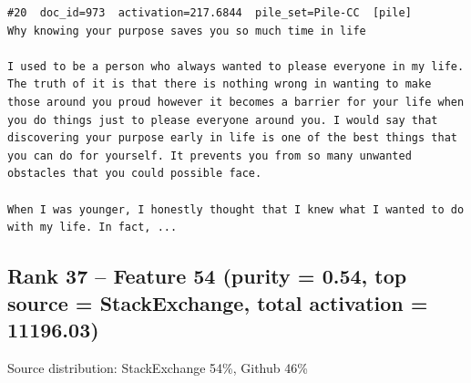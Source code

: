 \begin{verbatim}
#20  doc_id=973  activation=217.6844  pile_set=Pile-CC  [pile]
Why knowing your purpose saves you so much time in life

I used to be a person who always wanted to please everyone in my life. The truth of it is that there is nothing wrong in wanting to make those around you proud however it becomes a barrier for your life when you do things just to please everyone around you. I would say that discovering your purpose early in life is one of the best things that you can do for yourself. It prevents you from so many unwanted obstacles that you could possible face.

When I was younger, I honestly thought that I knew what I wanted to do with my life. In fact, ...

\end{verbatim}

\subsection*{Rank 37 -- Feature 54 (purity = 0.54, top source = StackExchange, total activation = 11196.03)}

Source distribution: StackExchange 54\%, Github 46\%

